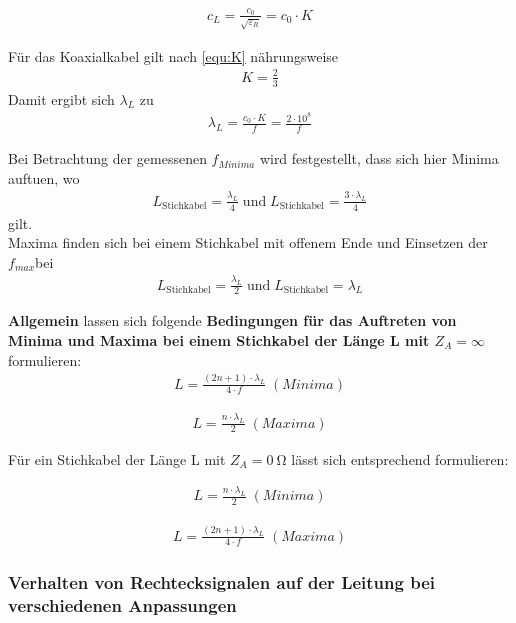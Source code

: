 \documentclass[a4paper,twoside,final]{article}
\begin{document}
 \begin{align}
   c_{L} = \frac{c_0}{\sqrt{\varepsilon_R}} = c_0 \cdot K
 \end{align}

 Für das Koaxialkabel gilt nach \ref{equ:K} nährungsweise
 \begin{align}
   K = \frac{2}{3}
 \end{align}
 Damit ergibt sich $\lambda_{L}$ zu
 \begin{align}
 \lambda_{L} = \frac{c_0 \cdot K}{f} = \frac{2 \cdot 10^8}{f}
 \end{align}

 Bei Betrachtung der gemessenen $f_{Minima}$ wird festgestellt, dass sich hier Minima auftuen, wo
 \begin{align}
   L_{\text{Stichkabel}} = \frac{\lambda_{L}}{4} \; \text{und} \; L_{\text{Stichkabel}} = \frac{3\cdot \lambda_{L}}{4}
 \end{align}
 gilt. \\
 Maxima finden sich bei einem Stichkabel mit offenem Ende und Einsetzen der $f_{max}$bei
 \begin{align}
 L_{\text{Stichkabel}} = \frac{\lambda_{L}}{2} \; \text{und} \; L_{\text{Stichkabel}} = \lambda_{L}
 \end{align}

 \textbf{Allgemein} lassen sich folgende \textbf{Bedingungen für das Auftreten von Minima und Maxima bei einem Stichkabel der Länge L mit $Z_A = \infty$} formulieren:
 \begin{align}
 L = \frac{(2n+1)\cdot \lambda_{L}}{4\cdot f} \; (Minima)
 \end{align}

 \begin{align}
 L = \frac{n \cdot \lambda_{L}}{2} \; (Maxima)
 \end{align}

 Für ein Stichkabel der Länge L mit $Z_A = \SI{0}{\ohm}$ lässt sich entsprechend formulieren:

 \begin{align}
 L = \frac{n \cdot \lambda_{L}}{2} \; (Minima)
 \end{align}

 \begin{align}
 L = \frac{(2n+1)\cdot \lambda_{L}}{4\cdot f} \; (Maxima)
 \end{align}
\subsubsection{Verhalten von Rechtecksignalen auf der Leitung bei verschiedenen Anpassungen}
\end{document}

